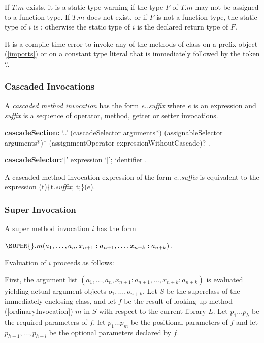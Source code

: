 \documentclass{article}
\newcommand{\code}[1]{{\sf #1}}
\begin{document}
\LMHash{}
If $T.m$ exists, it  is a static type warning if the type $F$ of $T.m$ may not be assigned to a function type. If $T.m$ does not exist, or if $F$ is not a function type, the static type of $i$ is \DYNAMIC{}; otherwise the static type of $i$ is the declared return type of  $F$.  

\LMHash{}
It is a compile-time error to invoke any of the methods of class  on a prefix object (\ref{imports}) or on a constant type literal that is  immediately followed by the token `.'.


\subsubsection{Cascaded Invocations}

\LMHash{}
A {\em cascaded method invocation} has the form {\em e..suffix}
where $e$ is an expression and {\em suffix} is a sequence of operator, method, getter or setter invocations.

\begin{grammar}
{\bf cascadeSection:}
      `{\escapegrammar ..}' (cascadeSelector arguments*) (assignableSelector arguments*)* (assignmentOperator expressionWithoutCascade)?
      .
     
{\bf cascadeSelector:}`['  expression `]';
      identifier
      .
\end{grammar}

\LMHash{}
A cascaded method invocation expression of the form {\em e..suffix} is equivalent to the expression \code{(t)\{t.{\em suffix}; \RETURN{} t;\}($e$)}.

\subsubsection{Super Invocation}

\LMHash{}
A super method invocation $i$ has the form 

$\SUPER{}.m(a_1, \ldots , a_n, x_{n+1}: a_{n+1}, \ldots , x_{n+k}: a_{n+k})$.

\LMHash{}
Evaluation of $i$ proceeds as follows:

\LMHash{}
First, the argument list $(a_1, \ldots , a_n, x_{n+1}: a_{n+1}, \ldots , x_{n+k}: a_{n+k})$ is evaluated  yielding actual argument objects $o_1, \ldots , o_{n+k}$. Let $S$ be the superclass of the immediately enclosing class, and let $f$ be the result of looking up method (\ref{ordinaryInvocation})  $m$ in $S$  with respect to the current library $L$. 
Let $p_1 \ldots p_h$ be the required parameters of $f$,  let $p_1 \ldots p_m$ be the positional parameters of $f$ and let $p_{h+1}, \ldots, p_{h+l}$ be the optional parameters declared by $f$.
\end{document}
